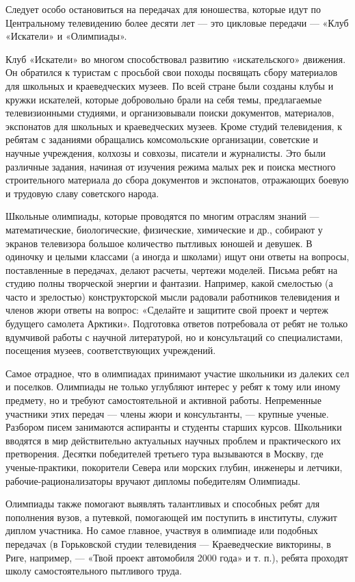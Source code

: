 \documentclass[12pt, a4paper, openany]{book}
\begin{document}
Следует особо остановиться на передачах для юношества, которые идут по Центральному телевидению более десяти лет — это цикловые передачи — «Клуб «Искатели» и «Олимпиады». 

Клуб «Искатели» во многом способствовал развитию «искательского» движения. Он обратился к туристам с просьбой свои походы посвящать сбору материалов для школьных и краеведческих музеев. По всей стране были созданы клубы и кружки искателей, которые добровольно брали на себя темы, предлагаемые телевизионными студиями, и организовывали поиски документов, материалов, экспонатов для школьных и краеведческих музеев. Кроме студий телевидения, к ребятам с заданиями обращались комсомольские организации, советские и научные учреждения, колхозы и совхозы, писатели и журналисты. Это были различные задания, начиная от изучения режима малых рек и поиска местного строительного материала до сбора документов и экспонатов, отражающих боевую и трудовую славу советского народа. 

Школьные олимпиады, которые проводятся по многим отраслям знаний — математические, биологические, физические, химические и др., собирают у экранов телевизора большое количество пытливых юношей и девушек. В одиночку и целыми классами (а иногда и школами) ищут они ответы на вопросы, поставленные в передачах, делают расчеты, чертежи моделей. Письма ребят на студию полны творческой энергии и фантазии. Например, какой смелостью (а часто и зрелостью) конструкторской мысли радовали работников телевидения и членов жюри ответы на вопрос: «Сделайте и защитите свой проект и чертеж будущего самолета Арктики». Подготовка ответов потребовала от ребят не только вдумчивой работы с научной литературой, но и консультаций со специалистами, посещения музеев, соответствующих учреждений. 

Самое отрадное, что в олимпиадах принимают участие школьники из далеких сел и поселков. Олимпиады не только углубляют интерес у ребят к тому или иному предмету, но и требуют самостоятельной и активной работы. Непременные участники этих передач — члены жюри и консультанты, — крупные ученые. Разбором писем занимаются аспиранты и студенты старших курсов. Школьники вводятся в мир действительно актуальных научных проблем и практического их претворения. Десятки победителей третьего тура вызываются в Москву, где ученые-практики, покорители Севера или морских глубин, инженеры и летчики, рабочие-рационализаторы вручают дипломы победителям Олимпиады. 

Олимпиады также помогают выявлять талантливых и способных ребят для пополнения вузов, а путевкой, помогающей им поступить в институты, служит диплом участника. Но самое главное, участвуя в олимпиаде или подобных передачах (в Горьковской студии телевидения — Краеведческие викторины, в Риге, например, — «Твой проект автомобиля 2000 года» и т. п.), ребята проходят школу самостоятельного пытливого труда. 
\end{document}
